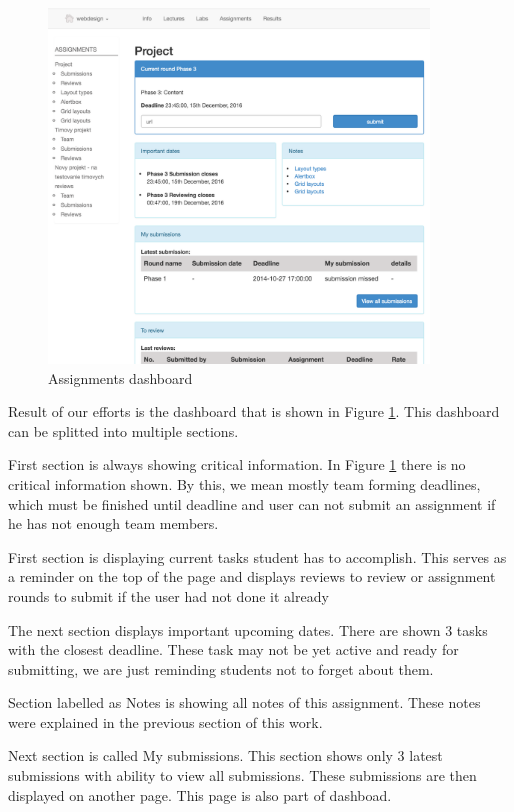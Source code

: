 \begin{figure}[h]
    \centering
    \includegraphics[width=0.9\textwidth]{images/dashboard.png}
    \caption{Assignments dashboard}
    \label{fig:assignments_dashboard}
\end{figure}

Result of our efforts is the dashboard that is shown in Figure \ref{fig:assignments_dashboard}. This dashboard can be splitted into multiple sections.

First section is always showing critical information. In Figure \ref{fig:assignments_dashboard} there is no critical information shown. By this, we mean mostly team forming deadlines, which must be finished until deadline and user can not submit an assignment if he has not enough team members.

First section is displaying current tasks student has to accomplish. This serves as a reminder on the top of the page and displays reviews to review or assignment rounds to submit if the user had not done it already

The next section displays important upcoming dates. There are shown 3 tasks with the closest deadline. These task may not be yet active and ready for submitting, we are just reminding students not to forget about them. 

Section labelled as Notes is showing all notes of this assignment. These notes were explained in the previous section of this work.

Next section is called My submissions. This section shows only 3 latest submissions with ability to view all submissions. These submissions are then displayed on another page. This page is also part of dashboad.

